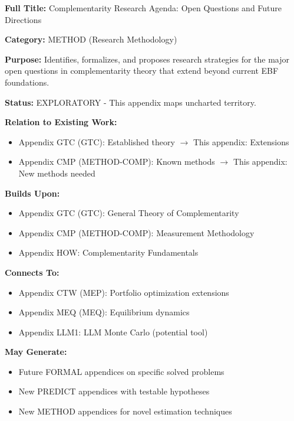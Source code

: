 \begin{tcolorbox}[colback=purple!5!white,colframe=purple!75!black,title=\textbf{Appendix RSH: METHOD-RESEARCH}]
\textbf{Full Title:} Complementarity Research Agenda: Open Questions and Future Directions

\textbf{Category:} METHOD (Research Methodology)

\textbf{Purpose:} Identifies, formalizes, and proposes research strategies for the major open questions in complementarity theory that extend beyond current EBF foundations.

\textbf{Status:} EXPLORATORY - This appendix maps uncharted territory.

\textbf{Relation to Existing Work:}
\begin{itemize}[noitemsep]
    \item Appendix GTC (GTC): Established theory $\to$ This appendix: Extensions
    \item Appendix CMP (METHOD-COMP): Known methods $\to$ This appendix: New methods needed
\end{itemize}
\end{tcolorbox}

\begin{tcolorbox}[colback=gray!5!white,colframe=gray!75!black,title=\textbf{Cross-Reference Map}]
\small
\textbf{Builds Upon:}
\begin{itemize}[noitemsep]
    \item Appendix GTC (GTC): General Theory of Complementarity
    \item Appendix CMP (METHOD-COMP): Measurement Methodology
    \item Appendix HOW: Complementarity Fundamentals
\end{itemize}

\textbf{Connects To:}
\begin{itemize}[noitemsep]
    \item Appendix CTW (MEP): Portfolio optimization extensions
    \item Appendix MEQ (MEQ): Equilibrium dynamics
    \item Appendix LLM1: LLM Monte Carlo (potential tool)
\end{itemize}

\textbf{May Generate:}
\begin{itemize}[noitemsep]
    \item Future FORMAL appendices on specific solved problems
    \item New PREDICT appendices with testable hypotheses
    \item New METHOD appendices for novel estimation techniques
\end{itemize}
\end{tcolorbox}

